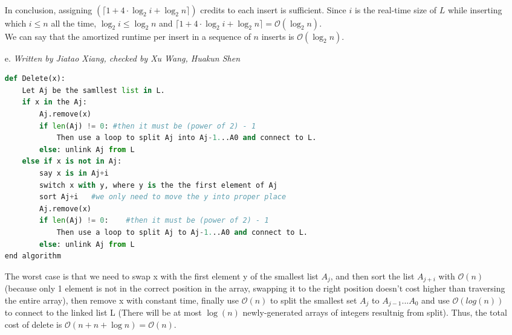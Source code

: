 \documentclass[10pt]{article}
\begin{document}
\begin{itemize}
\\
In conclusion, assigning $(\lceil 1+4\cdot\log_2i+\log_2n\rceil)$ credits to each insert is sufficient. Since $i$ is the real-time size of $L$ while inserting which $i\leq n$ all the time, $\log_2i\leq\log_2n$ and $\lceil 1+4\cdot\log_2i+\log_2n\rceil = \mathcal{O}(\log_2n)$. \\
We can say that the amortized runtime per insert in a sequence of $n$ inserts is $\mathcal{O}(\log_2n)$.
\item[e.]\textit{Written by Jiatao Xiang, checked by Xu Wang, Huakun Shen}
\begin{lstlisting}[language=Python]
def Delete(x):
	Let Aj be the samllest list in L.
	if x in the Aj:
		Aj.remove(x)
		if len(Aj) != 0: #then it must be (power of 2) - 1
			Then use a loop to split Aj into Aj-1...A0 and connect to L.
		else: unlink Aj from L
	else if x is not in Aj:
		say x is in Aj+i
		switch x with y, where y is the the first element of Aj
		sort Aj+i   #we only need to move the y into proper place
		Aj.remove(x)
		if len(Aj) != 0: 	#then it must be (power of 2) - 1
			Then use a loop to split Aj to Aj-1...A0 and connect to L.
		else: unlink Aj from L
end algorithm
\end{lstlisting}
The worst case is that we need to swap x with the first element y of the smallest list $A_j$, and then sort the list $A_{j+i}$ with $\mathcal{O}(n)$ (because only 1 element is not in the correct position in the array, swapping it to the right position doesn't cost higher than traversing the entire array), then remove x with constant time, finally use $\mathcal{O}(n)$ to split the smallest set  $A_j$ to $A_{j-1} ... A_0$ and use $\mathcal{O}(log(n))$ to connect to the linked list L (There will be at most $\log(n)$ newly-generated arrays of integers resultnig from split). Thus, the total cost of delete is $\mathcal{O}(n+n+\log n) = \mathcal{O}(n)$.
\end{itemize}
\end{document}
